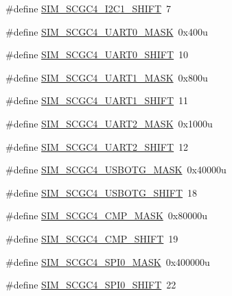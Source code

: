 \begin{DoxyCompactItemize}
\item 
\#define \hyperlink{group___s_i_m___register___masks_ga9f7b3fb0b1b7843cdf821b6b9a86ecfb}{S\+I\+M\+\_\+\+S\+C\+G\+C4\+\_\+\+I2\+C1\+\_\+\+S\+H\+I\+FT}~7
\item 
\#define \hyperlink{group___s_i_m___register___masks_ga8fc8faeefc38393c83454ceba120d5df}{S\+I\+M\+\_\+\+S\+C\+G\+C4\+\_\+\+U\+A\+R\+T0\+\_\+\+M\+A\+SK}~0x400u
\item 
\#define \hyperlink{group___s_i_m___register___masks_gae3407d4e1676ac6654898712335842b0}{S\+I\+M\+\_\+\+S\+C\+G\+C4\+\_\+\+U\+A\+R\+T0\+\_\+\+S\+H\+I\+FT}~10
\item 
\#define \hyperlink{group___s_i_m___register___masks_ga24a3ebc9f4c6154041b1a39b33f3c121}{S\+I\+M\+\_\+\+S\+C\+G\+C4\+\_\+\+U\+A\+R\+T1\+\_\+\+M\+A\+SK}~0x800u
\item 
\#define \hyperlink{group___s_i_m___register___masks_ga2eda3e80bcf9a5ee77ce321d86cd92d0}{S\+I\+M\+\_\+\+S\+C\+G\+C4\+\_\+\+U\+A\+R\+T1\+\_\+\+S\+H\+I\+FT}~11
\item 
\#define \hyperlink{group___s_i_m___register___masks_gaea7b7b8d6abc055026d4ca7299206597}{S\+I\+M\+\_\+\+S\+C\+G\+C4\+\_\+\+U\+A\+R\+T2\+\_\+\+M\+A\+SK}~0x1000u
\item 
\#define \hyperlink{group___s_i_m___register___masks_gae844b2ce3371466add7387b9ea32bc4c}{S\+I\+M\+\_\+\+S\+C\+G\+C4\+\_\+\+U\+A\+R\+T2\+\_\+\+S\+H\+I\+FT}~12
\item 
\#define \hyperlink{group___s_i_m___register___masks_ga136bfa98e3aafded899c9806d5410d4d}{S\+I\+M\+\_\+\+S\+C\+G\+C4\+\_\+\+U\+S\+B\+O\+T\+G\+\_\+\+M\+A\+SK}~0x40000u
\item 
\#define \hyperlink{group___s_i_m___register___masks_ga5d0dd9f68667fdf71fce1b0a6ae990dd}{S\+I\+M\+\_\+\+S\+C\+G\+C4\+\_\+\+U\+S\+B\+O\+T\+G\+\_\+\+S\+H\+I\+FT}~18
\item 
\#define \hyperlink{group___s_i_m___register___masks_gad7304bdb8fc46deb77c5e444e56fae40}{S\+I\+M\+\_\+\+S\+C\+G\+C4\+\_\+\+C\+M\+P\+\_\+\+M\+A\+SK}~0x80000u
\item 
\#define \hyperlink{group___s_i_m___register___masks_ga1072a5419bbeaf4081c6c4a5ca7cf86c}{S\+I\+M\+\_\+\+S\+C\+G\+C4\+\_\+\+C\+M\+P\+\_\+\+S\+H\+I\+FT}~19
\item 
\#define \hyperlink{group___s_i_m___register___masks_ga0b29e4c88f0494317c3cd447fb363f5e}{S\+I\+M\+\_\+\+S\+C\+G\+C4\+\_\+\+S\+P\+I0\+\_\+\+M\+A\+SK}~0x400000u
\item 
\#define \hyperlink{group___s_i_m___register___masks_ga4fd9f9a3ee78e060c7042597043c336c}{S\+I\+M\+\_\+\+S\+C\+G\+C4\+\_\+\+S\+P\+I0\+\_\+\+S\+H\+I\+FT}~22

\end{DoxyCompactItemize}
